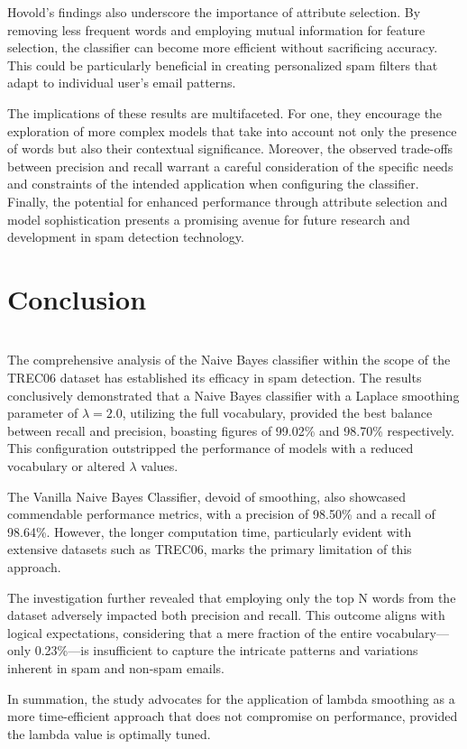 \documentclass{acm_proc_article-sp}
\begin{document}
Hovold's findings also underscore the importance of attribute selection. By removing less frequent words and employing mutual information for feature selection, the classifier can become more efficient without sacrificing accuracy. This could be particularly beneficial in creating personalized spam filters that adapt to individual user's email patterns.

The implications of these results are multifaceted. For one, they encourage the exploration of more complex models that take into account not only the presence of words but also their contextual significance. Moreover, the observed trade-offs between precision and recall warrant a careful consideration of the specific needs and constraints of the intended application when configuring the classifier. Finally, the potential for enhanced performance through attribute selection and model sophistication presents a promising avenue for future research and development in spam detection technology.

\section{Conclusion}~\\
The comprehensive analysis of the Naive Bayes classifier within the scope of the TREC06 dataset has established its efficacy in spam detection. The results conclusively demonstrated that a Naive Bayes classifier with a Laplace smoothing parameter of \(\lambda=2.0\), utilizing the full vocabulary, provided the best balance between recall and precision, boasting figures of 99.02\% and 98.70\% respectively. This configuration outstripped the performance of models with a reduced vocabulary or altered \(\lambda\) values.

The Vanilla Naive Bayes Classifier, devoid of smoothing, also showcased commendable performance metrics, with a precision of 98.50\% and a recall of 98.64\%. However, the longer computation time, particularly evident with extensive datasets such as TREC06, marks the primary limitation of this approach.

The investigation further revealed that employing only the top N words from the dataset adversely impacted both precision and recall. This outcome aligns with logical expectations, considering that a mere fraction of the entire vocabulary—only 0.23\%—is insufficient to capture the intricate patterns and variations inherent in spam and non-spam emails.

In summation, the study advocates for the application of lambda smoothing as a more time-efficient approach that does not compromise on performance, provided the lambda value is optimally tuned.
\end{document}
